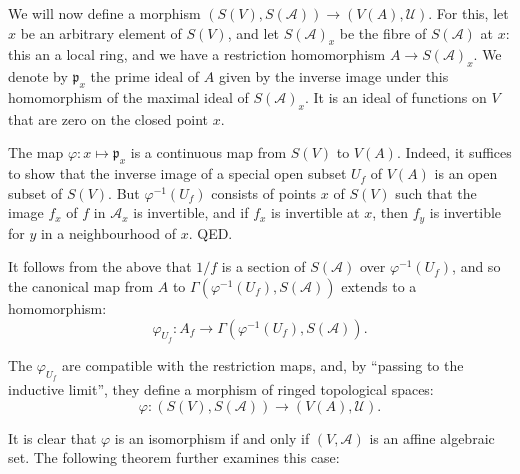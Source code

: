 \documentclass[british]{article}
\newcommand{\oldpage}[1]{\marginpar{\footnotesize$\Big\vert$ \textit{p.~#1}}}
\begin{document}
We will now define a morphism
\((S(V),S({\mathscr{A}}))\to(V(A),{\mathscr{U}})\). For this, let \(x\)
be an arbitrary element of \(S(V)\), and let \(S({\mathscr{A}})_x\) be
the fibre of \(S({\mathscr{A}})\) at \(x\): this an a local ring, and we
have a restriction homomorphism \(A\to S({\mathscr{A}})_x\). We denote
by \(\mathfrak{p}_x\) the prime ideal of \(A\) given by the inverse
image under this homomorphism of the maximal ideal of
\(S({\mathscr{A}})_x\). It is an ideal of functions on \(V\) that are
zero on the closed point \(x\).

The map \(\varphi\colon x\mapsto\mathfrak{p}_x\) is a continuous map
from \(S(V)\) to \(V(A)\). Indeed, it suffices to show that the inverse
image of a special open subset \(U_f\) of \(V(A)\) is an open subset of
\(S(V)\). But \(\varphi^{-1}(U_f)\) consists of points \(x\) of \(S(V)\)
such that the image \(f_x\) of \(f\) in \({\mathscr{A}}_x\) is
invertible, and if \(f_x\) is invertible at \(x\), then \(f_y\) is
invertible for \(y\) in a neighbourhood of \(x\). QED.

It follows from the above that \(1/f\) is a section of
\(S({\mathscr{A}})\) over \(\varphi^{-1}(U_f)\), and so the canonical
map from \(A\) to \(\Gamma(\varphi^{-1}(U_f),S({\mathscr{A}}))\) extends
to a homomorphism: \[
  \varphi_{U_f}\colon A_f \to \Gamma(\varphi^{-1}(U_f), S({\mathscr{A}})).
\]

The \(\varphi_{U_f}\) are compatible with the restriction maps, and, by
``passing to the inductive limit'', they define a morphism of ringed
topological spaces: \oldpage{2-05} \[
  \varphi\colon (S(V),S({\mathscr{A}})) \to (V(A),{\mathscr{U}}).
\]

It is clear that \(\varphi\) is an isomorphism if and only if
\((V,{\mathscr{A}})\) is an affine algebraic set. The following theorem
further examines this case:
\end{document}
